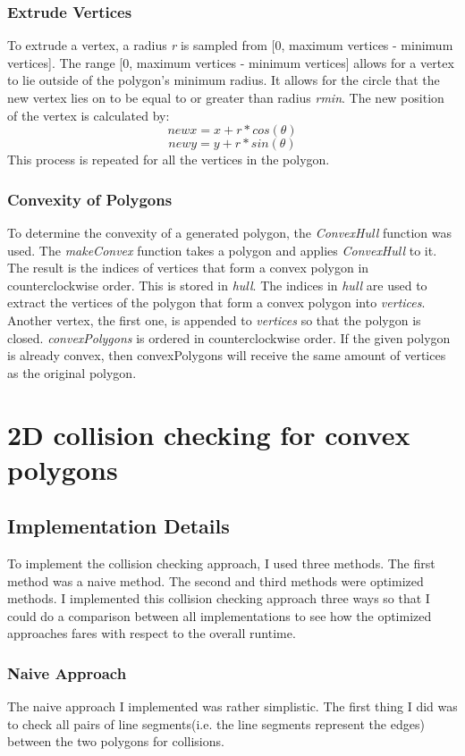 \documentclass{article}
\begin{document}
\subsubsection{Extrude Vertices}
To extrude a vertex, a radius \textit{r} is sampled from [0, maximum vertices - minimum vertices]. The range [0, maximum vertices - minimum vertices] allows for a vertex to lie outside of the polygon's minimum radius. It allows for the circle that the new vertex lies on to be equal to or greater than radius \textit{rmin}. The new position of the vertex is calculated by: 
    \[new x = x + r*cos(\theta)\]
    \[new y = y + r*sin(\theta)\]
This process is repeated for all the vertices in the polygon. 
\subsubsection{Convexity of Polygons}
To determine the convexity of a generated polygon, the \textit{ConvexHull} function was used. The \textit{makeConvex} function takes a polygon and applies \textit{ConvexHull} to it. The result is the indices of vertices that form a convex polygon in counterclockwise order. This is stored in \textit{hull}. The indices in \textit{hull} are used to extract the vertices of the polygon that form a convex polygon into \textit{vertices}. Another vertex, the first one, is appended to \textit{vertices} so that the polygon is closed. \textit{convexPolygons} is ordered in counterclockwise order. If the given polygon is already convex, then convexPolygons will receive the same amount of vertices as the original polygon. 

\section{2D collision checking for convex polygons}
\subsection{Implementation Details} 
To implement the collision checking approach, I used three methods. The first method was a naive method. The second and third methods were optimized methods. I implemented this collision checking approach three ways so that I could do a comparison between all implementations to see how the optimized approaches fares with respect to the overall runtime. 

\subsubsection{Naive Approach}
The naive approach I implemented was rather simplistic. The first thing I did was to check all pairs of line segments(i.e. the line segments represent the edges) between the two polygons for collisions. \newline 
\end{document}
